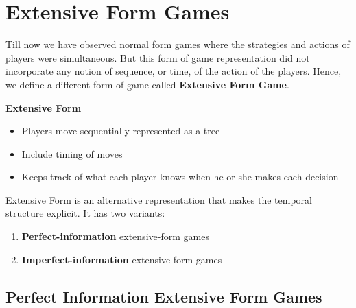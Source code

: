 \section{Extensive Form Games}
Till now we have observed normal form games where the strategies and actions of players were simultaneous. But this form of game representation did not incorporate any notion of sequence, or time, of the action of the players. Hence, we define a different form of game called \textbf{Extensive Form Game}.\\

\begin{large}\begin{flushleft}\textbf{Extensive Form}\end{flushleft}\end{large}
\begin{itemize}
\item Players move sequentially represented as a tree
\item Include timing of moves
\item Keeps track of what each player knows when he or she makes each decision
\end{itemize}

Extensive Form is an alternative representation that makes the temporal structure explicit. It has two variants:
\begin{enumerate}
\item \textbf{Perfect-information} extensive-form games
\item \textbf{Imperfect-information} extensive-form games
\end{enumerate}

\subsection{Perfect Information Extensive Form Games}

